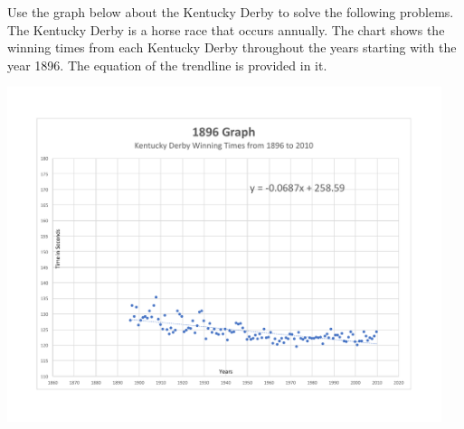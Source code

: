 \documentclass{ximera}
\author{David Kish}
\begin{document}
Use the graph below about the Kentucky Derby to solve the following problems.  The Kentucky Derby is a horse race that occurs annually.  The chart shows the winning times from each Kentucky Derby throughout the years starting with the year 1896. The equation of the trendline is provided in it.

\begin{image}
\includegraphics[width=5in]{1896graph.pdf}
\end{image}
\end{document}
